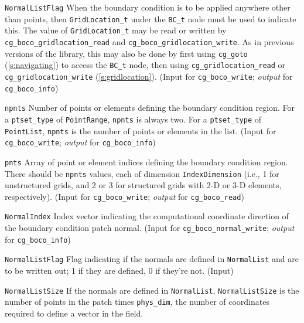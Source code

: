 \begin{Ventryi}{\texttt{NormalListFlag}}
      When the boundary condition is to be applied anywhere other than points,
      then \texttt{GridLocation\_t} under the \texttt{BC\_t} node must
      be used to indicate this.
      The value of \texttt{GridLocation\_t} may be read or written by
      \texttt{cg\_boco\_gridlocation\_read} and
      \texttt{cg\_boco\_gridlocation\_write}.
      As in previous versions of the library, this may also be done by
      first using \texttt{cg\_goto} (\autoref{s:navigating})
      to access the \texttt{BC\_t} node, then using
      \texttt{cg\_gridlocation\_read} or
      \texttt{cg\_gridlocation\_write} (\autoref{s:gridlocation}).
      (\textcolor{input}{Input} for \texttt{cg\_boco\_write};
      \textcolor{output}{\textit{output}} for \texttt{cg\_boco\_info})
\item [\texttt{npnts}]
      Number of points or elements defining the boundary
      condition region.
      For a \texttt{ptset\_type} of \texttt{PointRange},
      \texttt{npnts} is always two.
      For a \texttt{ptset\_type} of \texttt{PointList},
      \texttt{npnts} is the number of points or elements in the list.
      (\textcolor{input}{Input} for \texttt{cg\_boco\_write};
      \textcolor{output}{\textit{output}} for \texttt{cg\_boco\_info})
\item [\texttt{pnts}]
      Array of point or element indices defining the boundary condition
      region.
      There should be \texttt{npnts} values, each of dimension
      \texttt{IndexDimension} (i.e., 1 for unstructured grids,
      and 2 or 3 for structured grids with 2-D or 3-D elements,
      respectively).
      (\textcolor{input}{Input} for \texttt{cg\_boco\_write};
      \textcolor{output}{\textit{output}} for \texttt{cg\_boco\_read})
\item [\texttt{NormalIndex}]
      Index vector indicating the computational coordinate direction
      of the boundary condition patch normal.
      (\textcolor{input}{Input} for \texttt{cg\_boco\_normal\_write};
      \textcolor{output}{\textit{output}} for \texttt{cg\_boco\_info})
\item [\texttt{NormalListFlag}]
      Flag indicating if the normals are defined in \texttt{NormalList}
      and are to be written out; 1 if they are defined, 0 if they're not.
      (\textcolor{input}{Input})
\item [\texttt{NormalListSize}]
      If the normals are defined in
      \texttt{NormalList}, \texttt{NormalListSize} is the number of points
      in the patch times \texttt{phys\_dim}, the number of coordinates
      required to define a vector in the field.

\end{Ventryi}
